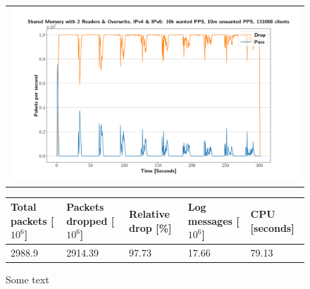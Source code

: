 \begin{figure}[p]
	\label{fig:simplefail2ban:shm:or}
	\centering
	\scriptsize
	\begin{tabular}{c}
    	\centerline{\includegraphics[width=1.2\textwidth]{images/simplefail2ban_shm_2r_or_ipv46_v10k_iv10m_c131068.png}}
	\end{tabular}
	\begin{tabular}{lllll}
		\toprule
		\textbf{Total packets [$10^6$]} & \textbf{Packets dropped [$10^6$]} & \textbf{Relative drop [\%]} & \textbf{Log messages [$10^6$]} & \textbf{CPU [seconds]} \\ \midrule 
		2988.9 & 2914.39 & 97.73 & 17.66 & 79.13 \\
		\bottomrule
	\end{tabular}
	\caption[Simplefail2ban, Shared Memory 2 Readers with Overwrite]{Some text}
\end{figure}

